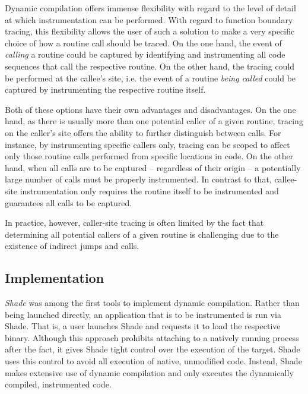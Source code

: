 Dynamic compilation offers immense flexibility with regard to the level of
detail at which instrumentation can be performed. With regard to function
boundary tracing, this flexibility allows the user of such a solution to make a very specific
choice of how a routine call should be traced. On the one hand, the event of 
\emph{calling} a routine could be captured by identifying and instrumenting all code
sequences that call the respective routine. On the other hand, the tracing could be
performed at the callee's site, i.e. the event of a routine \emph{being called} could be captured
by instrumenting the respective routine itself.

Both of these options have their own advantages and disadvantages.
On the one hand, as there is usually more than one potential caller of a given 
routine, tracing on the caller's site offers the ability to further distinguish
between calls. For instance, by instrumenting specific callers only, tracing
can be scoped to affect only those routine calls performed from 
specific locations in code. On the other hand, when all calls are to be captured --
regardless of their origin -- a potentially large number of calls must be properly
instrumented. In contrast to that, callee-site instrumentation only requires
the routine itself to be instrumented and guarantees all calls to be captured.

In practice, however, caller-site tracing is often limited by the fact that determining all
potential callers of a given routine is challenging due to the existence
of indirect jumps and calls. 




\subsection*{Implementation}

\emph{Shade} \cite{cmelik94shade} was among the first tools to implement dynamic compilation. 
Rather than being launched directly, an application that is to be instrumented is run
via Shade. That is, a user launches Shade and requests it to load the respective 
binary. Although this approach prohibits attaching to a natively running process after
the fact, it gives Shade tight control over the execution of the target. Shade
uses this control to avoid all execution of native, unmodified code. Instead, 
Shade makes extensive use of dynamic compilation and only executes the 
dynamically compiled, instrumented code.

